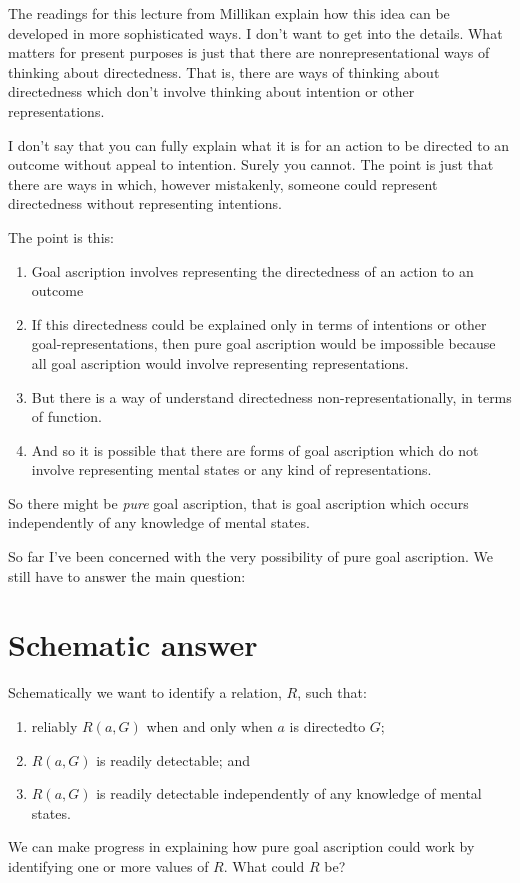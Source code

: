 \documentclass[12pt,\papersize]{extarticle}
\begin{document}
The readings for this lecture from Millikan explain how this idea can be developed in more sophisticated ways.
I don't want to get into the details.
What matters for present purposes is just that there are nonrepresentational ways of thinking about directedness.
That is, there are ways of thinking about directedness which don't involve thinking about intention or other representations.

I don't say that you can fully explain what it is for an action to be directed to an outcome without appeal to intention.
Surely you cannot.
The point is just that there are ways in which, however mistakenly, someone could represent directedness without representing intentions.

The point is this:
\begin{enumerate}
\item Goal ascription involves representing the directedness of an action to an outcome
\item If this directedness could be explained only in terms of intentions or other goal-representations, then pure goal ascription would be impossible because all goal ascription would involve representing representations.
\item But there is a way of understand directedness non-representationally, in terms of function.
\item And so it is possible that there are forms of goal ascription which do not involve representing mental states or any kind of representations.
\end{enumerate}
%
So there might be  \emph{pure} goal ascription, that is goal ascription which occurs independently of any knowledge of mental states.

So far I've been concerned with the very possibility of pure goal ascription.
We still have to answer the main question:
	\theQuestion


\section{Schematic answer}
Schematically we want to identify a relation, $R$, such that:
\begin{enumerate}
\item reliably $R(a,G)$ when and only when $a$ is directed\footnotemark to $G$; 
\item $R(a,G)$ is readily detectable; and 
\item $R(a,G)$ is readily detectable independently of any knowledge of mental states.
\end{enumerate}
%
%
We can make progress in explaining how pure goal ascription could work by identifying one or more values of $R$.
What could $R$ be?
\end{document}

